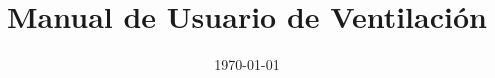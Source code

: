 ﻿\documentclass[12pt,a4paper]{article}
\title{Manual de Usuario de Ventilaci\'on}
\author{}
\date{\today}
\begin{document}
\maketitle
\manualnotalinks
\manualnavegacion
\tableofcontents
\newpage



\bigskip
\manualnavegacion
\end{document}
